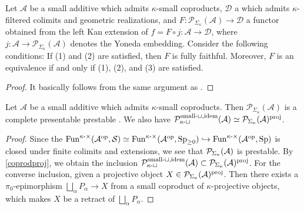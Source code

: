 \documentclass[a4paper,10pt, oneside]{amsart}
\begin{document}
\begin{prop}\label{kcprojgen}
	Let $\mathcal{A}$ be a small additive \infcat which admits $\kappa$-small coproducts, $\mathcal{D}$ a \infcat which admits $\kappa$-filtered colimits and geometric realizations, and $F: \mathcal{P}_{\Sigma_\kappa}(\mathcal{A}) \rightarrow \mathcal{D}$ a functor obtained  from  the left Kan extension of $f=F \circ j: \mathcal{A} \rightarrow \mathcal{D}$, where $j: \mathcal{A} \rightarrow \mathcal{P}_{\Sigma_\kappa}(\mathcal{A})$ denotes the Yoneda embedding. Consider the following conditions:
	If (1) and (2) are satisfied, then $F$ is fully faithful. Moreover, $F$ is an equivalence if and only if (1), (2), and (3) are satisfied.
	
\end{prop}
\begin{proof}
	It basically follows from the same argument as \cite[Proposition 5.3.5.11]{htt}.
\end{proof}

\begin{prop}
	Let $\mathcal{A}$ be a small additive \infcat which admits $\kappa$-small coproducts. Then  $\mathcal{P}_{\Sigma_\kappa}(\mathcal{A})$ is a complete presentable prestable \infcat. We also have $\mathcal{P}_{\kappa\text{-}\sqcup}^{\mathrm{small}\text{-}\sqcup,\mathrm{idem}}(\mathcal{A})\simeq \mathcal{P}_{\Sigma_\kappa}(\mathcal{A})^{\mathrm{proj}}$.
\end{prop}

\begin{proof}
	Since the $\operatorname{Fun}^{\kappa\text{-}\times}(\mathcal{A}^{\mathrm{op}},\mathcal{S})\simeq\operatorname{Fun}^{\kappa\text{-}\times}(\mathcal{A}^{\mathrm{op}},\operatorname{Sp}_{\geq0})\hookrightarrow\operatorname{Fun}^{\kappa\text{-}\times}(\mathcal{A}^{\mathrm{op}},\mathrm{Sp})$ is closed under finite colimits and extensions, we see that $\mathcal{P}_{\Sigma_\kappa}(\mathcal{A})$ is prestable. By \cref{coprodproj}, we obtain the inclusion $\mathcal{P}_{\kappa\text{-}\sqcup}^{\mathrm{small}\text{-}\sqcup,\mathrm{idem}}(\mathcal{A})\subset \mathcal{P}_{\Sigma_\kappa}(\mathcal{A})^{\mathrm{proj}}$. For the converse inclusion, given a projective object $X\in\mathcal{P}_{\Sigma_\kappa}(\mathcal{A})^{\mathrm{proj}}$. Then there exists a $\pi_0$-epimorphism $\bigsqcup_\alpha P_\alpha\to X$ from a small coproduct of $\kappa$-projective objects, which makes $X$ be a retract of $\bigsqcup_\alpha P_\alpha$.
\end{proof}
\end{document}
